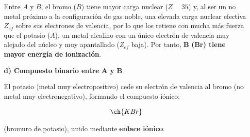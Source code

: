 \begin{exerciseEVAU}
\begin{solu}
        Entre \(A\) y \(B\), el bromo (\(B\)) tiene mayor carga nuclear (\(Z=35\)) y, al ser un no metal próximo a la configuración de gas noble, una elevada carga nuclear efectiva \(Z_{ef}\) sobre sus electrones de valencia, por lo que los retiene con mucha más fuerza que el potasio (\(A\)), un metal alcalino con un único electrón de valencia muy alejado del núcleo y muy apantallado (\(Z_{ef}\) baja). Por tanto, \(\boldsymbol{B}\) \textbf{(Br) tiene mayor energía de ionización}.

        \textbf{d) Compuesto binario entre A y B}

        El potasio (metal muy electropositivo) cede su electrón de valencia al bromo (no metal muy electronegativo), formando el compuesto iónico:

        \begin{equation*}
            \ch{KBr}
        \end{equation*}

        (bromuro de potasio), unido mediante \textbf{enlace iónico}.

    \end{solu}
\end{exerciseEVAU}


